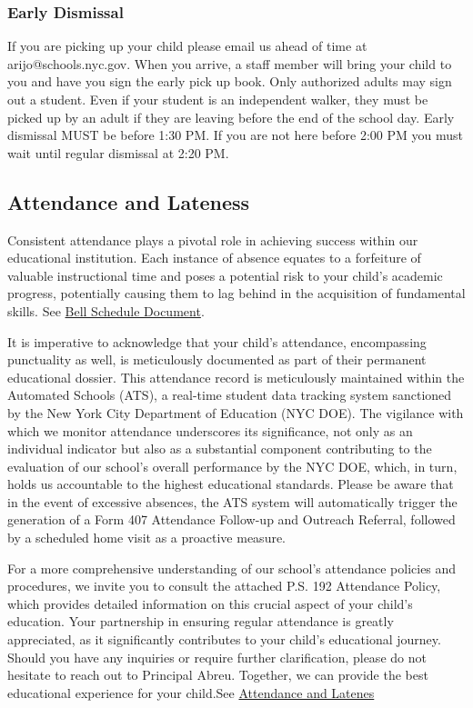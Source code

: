 \documentclass[11pt]{article}
\begin{document}
\subsubsection{Early Dismissal}
\label{sec:org3d59306}
If you are picking up your child please email us ahead of time at arijo@schools.nyc.gov. When you arrive, a staff member will bring your child to you and have you sign the early pick up book. Only authorized adults may sign out a student. Even if your student is an independent walker, they must be picked up by an adult if they are leaving before the end of the school day. Early dismissal MUST be before 1:30 PM. If you are not here before 2:00 PM you must wait until regular dismissal at 2:20 PM.

\subsection{Attendance and Lateness}
\label{sec:orgbddc78b}
Consistent attendance plays a pivotal role in achieving success within our educational institution. Each instance of absence equates to a forfeiture of valuable instructional time and poses a potential risk to your child’s academic progress, potentially causing them to lag behind in the acquisition of fundamental skills. See \href{https://4.files.edl.io/3b80/09/17/23/025447-0ea48bb2-237d-4b10-bb0c-c54719f66e99.pdf}{Bell Schedule Document}.

It is imperative to acknowledge that your child’s attendance, encompassing punctuality as well, is meticulously documented as part of their permanent educational dossier. This attendance record is meticulously maintained within the Automated Schools (ATS), a real-time student data tracking system sanctioned by the New York City Department of Education (NYC DOE). The vigilance with which we monitor attendance underscores its significance, not only as an individual indicator but also as a substantial component contributing to the evaluation of our school’s overall performance by the NYC DOE, which, in turn, holds us accountable to the highest educational standards. Please be aware that in the event of excessive absences, the ATS system will automatically trigger the generation of a Form 407 Attendance Follow-up and Outreach Referral, followed by a scheduled home visit as a proactive measure.

For a more comprehensive understanding of our school’s attendance policies and procedures, we invite you to consult the attached P.S. 192 Attendance Policy, which provides detailed information on this crucial aspect of your child’s education. Your partnership in ensuring regular attendance is greatly appreciated, as it significantly contributes to your child’s educational journey. Should you have any inquiries or require further clarification, please do not hesitate to reach out to Principal Abreu. Together, we can provide the best educational experience for your child.See \hyperref[sec:org6ac01ef]{Attendance and Latenes}
\end{document}
